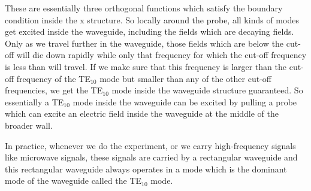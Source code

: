 These are essentially three orthogonal functions which satisfy the boundary condition inside the x structure. So locally around the probe, all kinds of modes get excited inside the waveguide, including the fields which are decaying fields. Only as we travel further in the waveguide, those fields which are below the cut-off will die down rapidly while only that frequency for which the cut-off frequency is less than will travel. If we make sure that this frequency is larger than the cut-off frequency of the TE$_{10}$ mode but smaller than any of the other cut-off frequencies, we get the TE$_{10}$ mode inside the waveguide structure guaranteed. So essentially a TE$_{10}$ mode inside the waveguide can be excited by pulling a probe which can excite an electric field inside the waveguide at the middle of the broader wall.

In practice, whenever we do the experiment, or we carry high-frequency signals like microwave signals, these signals are carried by a rectangular waveguide and this rectangular waveguide always operates in a mode which is the dominant mode of the waveguide called the TE$_{10}$ mode.

